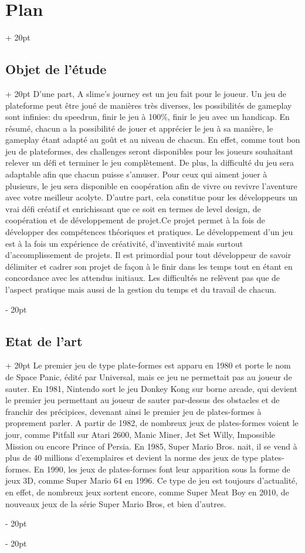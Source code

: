 \documentclass[a4paper, 12pt, twoside]{article}
\newcommand{\ind}[1][20pt]{\advance\leftskip + #1}
\newcommand{\deind}[1][20pt]{\advance\leftskip - #1}
\newenvironment{indt}[2][20pt]{#2 \par \ind[#1]}{\par \deind} %
\begin{document}
\begin{indt}{\section{Plan}}
        \begin{indt}{\subsection{Objet de l'étude}}
            D'une part, A slime's journey est un jeu fait pour le joueur. Un jeu de plateforme peut être joué de manières très diverses, les possibilités de gameplay sont infinies: du speedrun, finir le jeu à 100$\%$, finir le jeu avec un handicap. En résumé, chacun a la possibilité de jouer et apprécier le jeu à sa manière, le gameplay étant adapté au goût et au niveau de chacun. En effet, comme tout bon jeu de plateformes, des challenges seront disponibles pour les joueurs souhaitant relever un défi et terminer le jeu complètement. De plus, la difficulté du jeu sera adaptable afin que chacun puisse s'amuser. Pour ceux qui aiment jouer à plusieurs, le jeu sera disponible en coopération afin de vivre ou revivre l'aventure avec votre meilleur acolyte. D'autre part, cela constitue pour les développeurs un vrai défi créatif et enrichissant que ce soit en termes de level design, de coopération et de développement de projet.Ce projet permet à la fois de développer des compétences théoriques et pratiques. Le développement d'un jeu est à la fois un expérience de créativité, d'inventivité mais surtout d'accomplissement de projets. Il est primordial pour tout développeur de savoir délimiter et cadrer son projet de façon à le finir dans les temps tout en étant en concordance avec les attendus initiaux. Les difficultés ne relèvent pas que de l'aspect pratique mais aussi de la gestion du temps et du travail de chacun.

        \end{indt}

        \newpage

        \begin{indt}{\subsection{Etat de l'art}}
            Le premier jeu de type plate-formes est apparu en 1980 et porte le nom de Space Panic, édité par Universal, mais ce jeu ne permettait pas au joueur de sauter. En 1981, Nintendo sort le jeu Donkey Kong sur borne arcade, qui devient le premier jeu permettant au joueur de sauter par-dessus des obstacles et de franchir des précipices, devenant ainsi le premier jeu de plates-formes à proprement parler. A partir de 1982, de nombreux jeux de plates-formes voient le jour, comme Pitfall sur Atari 2600, Manic Miner, Jet Set Willy, Impossible Mission ou encore Prince of Persia. En 1985, Super Mario Bros. nait, il se vend à plus de 40 millions d'exemplaires et devient la norme des jeux de type plates-formes. En 1990, les jeux de plates-formes font leur apparition sous la forme de jeux 3D, comme Super Mario 64 en 1996. Ce type de jeu est toujours d'actualité, en effet, de nombreux jeux sortent encore, comme Super Meat Boy en 2010, de nouveaux jeux de la série Super Mario Bros, et bien d'autres.
        \end{indt}


\end{indt}
\end{document}
